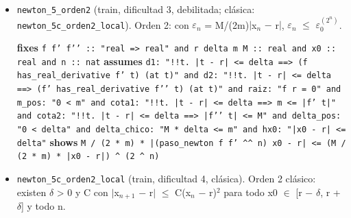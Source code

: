 \documentclass[11pt,a4paper]{article}
\begin{document}
\begin{itemize}
  \item \texttt{newton\_\allowbreak{}5\_\allowbreak{}orden2} (train, dificultad 3, debilitada; clásica: \texttt{newton\_\allowbreak{}5c\_\allowbreak{}orden2\_\allowbreak{}local}). Orden 2: con $\varepsilon _{n}$ = M/(2m)$|$x$_{n}$ $-$ r$|$, $\varepsilon _{n}$ $\le $ $\varepsilon _{0}^{(2^{n})}$.\\
  {\footnotesize \textbf{fixes} \texttt{f f' f'{}' :\allowbreak{}:\allowbreak{} "real =\allowbreak{}> real" and r delta m M :\allowbreak{}:\allowbreak{} real and x0 :\allowbreak{}:\allowbreak{} real and n :\allowbreak{}:\allowbreak{} nat} \textbf{assumes} \texttt{d1:\allowbreak{} "!{}!t. |\allowbreak{}t -\allowbreak{} r|\allowbreak{} <=\allowbreak{} delta =\allowbreak{}=\allowbreak{}> (\allowbreak{}f has\_\allowbreak{}real\_\allowbreak{}derivative f' t) (\allowbreak{}at t)" and d2:\allowbreak{} "!{}!t. |\allowbreak{}t -\allowbreak{} r|\allowbreak{} <=\allowbreak{} delta =\allowbreak{}=\allowbreak{}> (\allowbreak{}f' has\_\allowbreak{}real\_\allowbreak{}derivative f'{}' t) (\allowbreak{}at t)" and raiz:\allowbreak{} "f r =\allowbreak{} 0" and m\_\allowbreak{}pos:\allowbreak{} "0 < m" and cota1:\allowbreak{} "!{}!t. |\allowbreak{}t -\allowbreak{} r|\allowbreak{} <=\allowbreak{} delta =\allowbreak{}=\allowbreak{}> m <=\allowbreak{} |\allowbreak{}f' t|\allowbreak{}" and cota2:\allowbreak{} "!{}!t. |\allowbreak{}t -\allowbreak{} r|\allowbreak{} <=\allowbreak{} delta =\allowbreak{}=\allowbreak{}> |\allowbreak{}f'{}' t|\allowbreak{} <=\allowbreak{} M" and delta\_\allowbreak{}pos:\allowbreak{} "0 < delta" and delta\_\allowbreak{}chico:\allowbreak{} "M *\allowbreak{} delta <=\allowbreak{} m" and hx0:\allowbreak{} "|\allowbreak{}x0 -\allowbreak{} r|\allowbreak{} <=\allowbreak{} delta"} \textbf{shows} \texttt{M /\allowbreak{} (\allowbreak{}2 *\allowbreak{} m) *\allowbreak{} |\allowbreak{}(\allowbreak{}paso\_\allowbreak{}newton f f' \textasciicircum{}\textasciicircum{} n) x0 -\allowbreak{} r|\allowbreak{} <=\allowbreak{} (\allowbreak{}M /\allowbreak{} (\allowbreak{}2 *\allowbreak{} m) *\allowbreak{} |\allowbreak{}x0 -\allowbreak{} r|\allowbreak{}) \textasciicircum{} (\allowbreak{}2 \textasciicircum{} n)}\par}
  \item \texttt{newton\_\allowbreak{}5c\_\allowbreak{}orden2\_\allowbreak{}local} (train, dificultad 4, clásica). Orden 2 clásico: existen $\delta $ > 0 y C con $|$x$_{n+1}$ $-$ r$|$ $\le $ C(x$_{n}$ $-$ r)$^{2}$ para todo x0 $\in $ [r $-$ $\delta $, r + $\delta $] y todo n.\\

\end{itemize}
\end{document}
